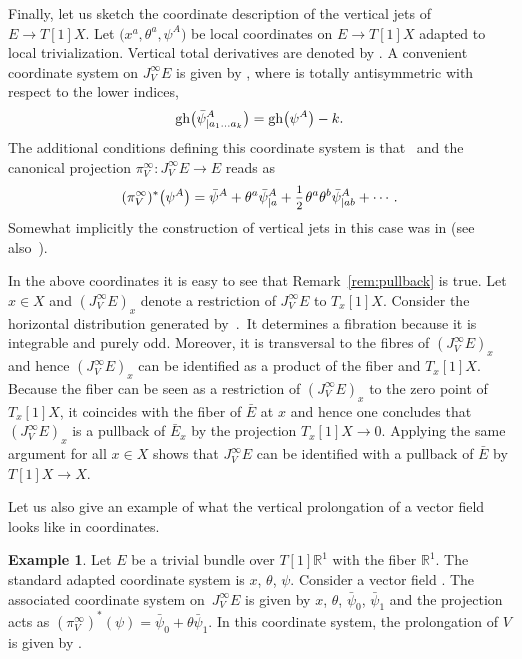 \documentclass[pdftex]{sigma}
\numberwithin{equation}{section}
\theoremstyle{definition}
\newtheorem{Example}[Theorem]{Example}
\renewcommand{\tilde}{\widetilde}
\renewcommand{\d}{\partial}
\newcommand{\half}{\mathchoice{%
 \ffrac{1}{2}}{\frac{1}{2}}{\frac{1}{2}}{\frac{1}{2}}}
\newcommand{\ffrac}[2]{\raisebox{.5pt}%
 {\footnotesize$\displaystyle\frac{#1}{#2}$}\kern1pt}
\newcommand{\dl}[1]{\mathchoice{\ffrac{\d}{\d #1}}{\frac{\d}{\d #1}}{\ffrac{\d}{\d #1}}{\ffrac{\d}{\d #1}}}
\newcommand{\fR}{\mathbb{R}}
\newcommand{\total}{\textbf{tot\,}}
\newcommand{\vprol}{\tilde}
\begin{document}
Finally, let us sketch the coordinate description of the vertical jets of $E\rightarrow T[1]X$. Let $\bigl(x^a,\theta^a,\psi^A\bigr)$ be local coordinates on $E\rightarrow T[1]X$ adapted to local trivialization. Vertical total derivatives
are denoted by \smash{$D^{(\theta)}_a=\total{\dl{\theta^a}}$}. A convenient coordinate system on $J^{\infty}_VE$ is given by , where  is totally antisymmetric with respect to the lower indices,
\[
{\rm gh}\bigl(\bar\psi^A_{|a_1\dots a_k}\bigr)={\rm gh}\bigl(\psi^A\bigr)-k.
\]
 The additional conditions defining this coordinate system is that~\smash{$D^{(\theta)}_a=\dl{\theta^a}$} and the canonical projection $\pi_V^\infty:J^\infty_VE\to E$ reads as
\begin{equation}
\label{projection-vert-jets}
(\pi_V^\infty)^*\bigl(\psi^A\bigr)=\bar\psi^A+\theta^a \bar\psi^A_{|a}+\half \theta^a\theta^b\bar\psi^A_{|ab}+\cdots.
\end{equation}
Somewhat implicitly the construction of vertical jets in this case was in
\cite{Grigoriev:2022zlq, Grigoriev:2019ojp,Grigoriev:2020xec} (see also~\mbox{\cite{Barnich:2009jy,Barnich:2010sw,bonavolonta2013}}).


In the above coordinates it is easy to see that Remark~\ref{rem:pullback} is true. Let $x\in X$ and $({J^\infty_VE})_x$ denote a restriction of $J^\infty_VE$ to $T_x[1]X$. Consider the horizontal distribution generated by~.~It determines a fibration because it is integrable and purely odd. Moreover, it is transversal to the fibres of ${(J^\infty_V E)}_x$ and hence ${(J^\infty_V E)}_x$ can be identified as a product of the fiber and $T_x[1]X$. Because the fiber can be seen as a restriction of ${(J^\infty_V E)}_x$ to the zero point of $T_x[1]X$, it coincides with the fiber of $\bar E$ at $x$ and hence one concludes that ${(J^\infty_V E)}_x$
is a pullback of $\bar E_x$ by the projection $T_x[1]X \to 0$. Applying the same argument for all $x\in X$ shows that $J^\infty_V E$ can be identified with a pullback of $\bar E$ by $T[1]X\to X$.

Let us also give an example of what the vertical prolongation of a vector field looks like in coordinates.

\begin{Example}
 Let $E$ be a trivial bundle over $T[1]\fR^1$ with the fiber $\fR^1$. The standard adapted coordinate system is $x$, $\theta$, $\psi$. Consider a vector field \smash{$V=\theta \dl{\psi}$}. The associated coordinate system on~$J^\infty_V E$ is given by $x$, $\theta$, $\bar\psi_0$, $\bar\psi_1$ and the projection acts as $(\pi^\infty_V)^*(\psi)=\bar\psi_0+\theta \bar\psi_1 $. In this coordinate system, the prolongation \smash{$\vprol V$} of $V$ is given by \smash{$\vprol V=-\frac{\partial}{\partial \bar{\psi}_1}$}.
\end{Example}
\end{document}
